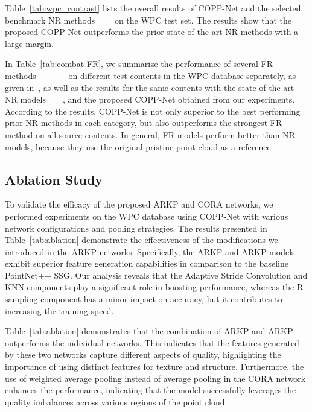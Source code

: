 \documentclass[conference]{IEEEtran}
\begin{document}
Table~\ref{tab:wpc_contrast} lists the overall results of COPP-Net and the selected benchmark NR methods~\cite{liu2021pqa}~\cite{zhang2022no}~\cite{liu2022point}~\cite{yang2022no} on the WPC test set. The results show that the proposed COPP-Net outperforms the prior state-of-the-art NR methods with a large margin. 

In Table~\ref{tab:combat FR}, we summarize the performance of several FR methods~\cite{mekuria2016evaluation}~\cite{mekuria2017performance}~\cite{meynet2020pcqm}~\cite{wang2004image}~\cite{yang2020inferring}~\cite{sheikh2006image}~\cite{liu2022perceptual} on different test contents in the WPC database separately, as given in~\cite{liu2022perceptual}, as well as the results for the same contents with the state-of-the-art NR models~\cite{liu2021pqa}~\cite{zhang2022no}~\cite{liu2022point}~\cite{yang2022no}, and the proposed COPP-Net obtained from our experiments. According to the results, COPP-Net is not only superior to the best performing prior NR methods in each category, but also outperforms the strongest FR method on all source contents. In general, FR models perform better than NR models, because they use the original pristine point cloud as a reference.



\subsection{Ablation Study}
To validate the efficacy of the proposed ARKP and CORA networks, we performed experiments on the WPC database using COPP-Net with various network configurations and pooling strategies. The results presented in Table~\ref{tab:ablation} demonstrate the effectiveness of the modifications we introduced in the ARKP networks. Specifically, the ARKP and ARKP models exhibit superior feature generation capabilities in comparison to the baseline PointNet++ SSG. Our analysis reveals that the Adaptive Stride Convolution and KNN components play a significant role in boosting performance, whereas the R-sampling component has a minor impact on accuracy, but it contributes to increasing the training speed.

Table~\ref{tab:ablation} demonstrates that the combination of ARKP and ARKP outperforms the individual networks. This indicates that the features generated by these two networks capture different aspects of quality, highlighting the importance of using distinct features for texture and structure. Furthermore, the use of weighted average pooling instead of average pooling in the CORA network enhances the performance, indicating that the model successfully leverages the quality imbalances across various regions of the point cloud.
\end{document}
